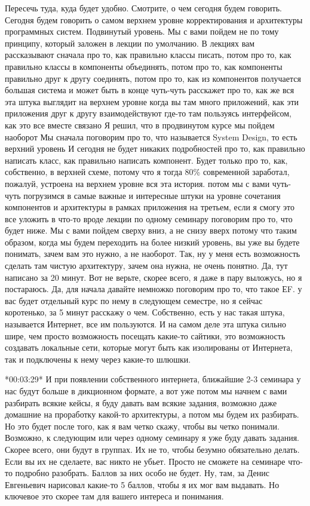 \documentclass[12pt]{article} %
\begin{document}
Пересечь туда, куда будет удобно.  Смотрите, о чем сегодня будем говорить.  Сегодня будем говорить о самом верхнем уровне корректирования и архитектуры программных систем.  Подвинутый уровень. Мы с вами пойдем не по тому принципу, который заложен в лекции по умолчанию. В лекциях вам рассказывают сначала про то, как правильно классы писать, потом про то, как правильно классы в компоненты объединять, потом про то, как компоненты правильно друг к другу соединять, потом про то, как из компонентов получается большая система и может быть в конце чуть-чуть расскажет про то, как же вся эта штука выглядит на верхнем уровне когда вы там много приложений, как эти приложения друг к другу взаимодействуют где-то там пользуясь интерфейсом, как это все вместе связано Я решил, что в продвинутом курсе мы пойдем наоборот Мы сначала поговорим про то, что называется System Design, то есть верхний уровень И сегодня не будет никаких подробностей про то, как правильно написать класс, как правильно написать компонент. Будет только про то, как, собственно, в верхней схеме, потому что я тогда 80\% современной заработал, пожалуй, устроена на верхнем уровне вся эта история.  потом мы с вами чуть-чуть погрузимся в самые важные и интересные штуки на уровне сочетания компонентов и архитектуры в рамках приложения на третьем, если я смогу это все уложить в что-то вроде лекции по одному семинару поговорим про то, что будет ниже. Мы с вами пойдем сверху вниз, а не снизу вверх потому что таким образом, когда мы будем переходить на более низкий уровень, вы уже вы будете понимать, зачем вам это нужно, а не наоборот.  Так, ну у меня есть возможность сделать там чистую архитектуру, зачем она нужна, не очень понятно.  Да, тут написано за 20 минут.  Вот не верьте, скорее всего, я даже в пару выложусь, но я постараюсь.  Да, для начала давайте немножко поговорим про то, что такое ЕF.  у вас будет отдельный курс по нему в следующем семестре, но я сейчас коротенько, за 5 минут расскажу о чем.  Собственно, есть у нас такая штука, называется Интернет, все им пользуются.  И на самом деле эта штука сильно шире, чем просто возможность посещать какие-то сайтики, это возможность создавать локальные сети, которые могут быть как изолированы от Интернета, так и подключены к нему через какие-то шлюшки.

*00:03:29*
И при появлении собственного интернета, ближайшие 2-3 семинара у нас будут больше в дикционном формате, а вот уже потом мы начнем с вами разбирать всякие кейсы, я буду давать вам всякие задания, возможно даже домашние на проработку какой-то архитектуры, а потом мы будем их разбирать.  Но это будет после того, как я вам четко скажу, чтобы вы четко понимали.  Возможно, к следующим или через одному семинару я уже буду давать задания.  Скорее всего, они будут в группах.  Их не то, чтобы безумно обязательно делать.  Если вы их не сделаете, вас никто не убьет.  Просто не сможете на семинаре что-то подробно разобрать.  Баллов за них особо не будет.  Ну, там, за Денис Евгеньевич нарисовал какие-то 5 баллов, чтобы я их мог вам выдавать.  Но ключевое это скорее там для вашего интереса и понимания.  
\end{document}
